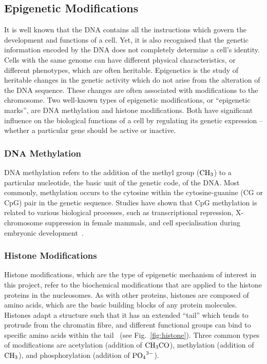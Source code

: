 \documentclass[12pt]{article}
\begin{document}
\subsection{Epigenetic Modifications}
It is well known that the DNA contains all the instructions which govern the development and functions of a cell. Yet, it is also recognised that the genetic information encoded by the DNA does not completely determine a cell's identity. Cells with the same genome can have different physical characteristics, or different phenotypes, which are often heritable. Epigenetics is the study of heritable changes in the genetic activity which do not arise from the alteration of the DNA sequence\cite{DNABook, probst2009}. These changes are often associated with modifications to the chromosome. Two well-known types of epigenetic modifications, or ``epigenetic marks'', are DNA methylation and histone modifications. Both have significant influence on the biological functions of a cell by regulating its genetic expression -- whether a particular gene should be active or inactive. 

\subsubsection{DNA Methylation}
DNA methylation refers to the addition of the methyl group ($\ce{CH3}$) to a particular nucleotide, the basic unit of the genetic code, of the DNA. Most commonly, methylation occurs to the cytosine within the cytosine-guanine (CG or CpG) pair in the genetic sequence. Studies have shown that CpG methylation is related to various biological processes, such as transcriptional repression, X-chromosome suppression in female mammals, and cell specialisation during embryonic development~\cite{DNABook, molcellbiobook}. 

\subsubsection{Histone Modifications}
\label{sec:histone}
Histone modifications, which are the type of epigenetic mechanism of interest in this project, refer to the biochemical modifications that are applied to the histone proteins in the nucleosomes. As with other proteins, histones are composed of amino acids, which are the basic building blocks of any protein molecules. Histones adapt a structure such that it has an extended ``tail'' which tends to protrude from the chromatin fibre, and different functional groups can bind to specific amino acids within the tail~\cite{strahl2000} (see Fig.~\ref{fig:histone}). Three common types of modifications are acetylation (addition of $\ce{CH3CO}$), methylation (addition of $\ce{CH3}$), and phosphorylation (addition of $\ce{PO4^{3-}}$). 
\end{document}
